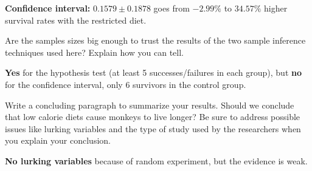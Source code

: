 \documentclass[12pt]{exam}
\begin{document}
\begin{questions}
\begin{solution}
\textbf{Confidence interval:} $0.1579 \pm 0.1878$ goes from $-2.99\%$ to $34.57\%$ higher survival rates with the restricted diet. 
\end{solution}


\item Are the samples sizes big enough to trust the results of the two sample inference techniques used here?  Explain how you can tell.  
\begin{solution}
\textbf{Yes} for the hypothesis test (at least 5 successes/failures in each group), but \textbf{no} for the confidence interval, only 6 survivors in the control group. 
\end{solution}


\item Write a concluding paragraph to summarize your results. Should we conclude that low calorie diets cause monkeys to live longer? Be sure to address possible issues like lurking variables and the type of study used by the researchers when you explain your conclusion.

\begin{solution}
\textbf{No lurking variables} because of random experiment, but the evidence is weak.   
\end{solution}
\end{questions}
\end{document}
